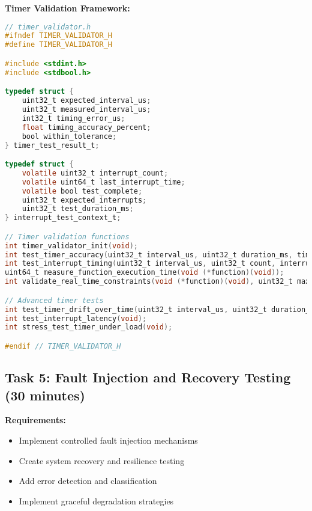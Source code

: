 \documentclass[11pt,a4paper]{article}
\begin{document}
\textbf{Timer Validation Framework:}
\begin{lstlisting}[language=C]
// timer_validator.h
#ifndef TIMER_VALIDATOR_H
#define TIMER_VALIDATOR_H

#include <stdint.h>
#include <stdbool.h>

typedef struct {
    uint32_t expected_interval_us;
    uint32_t measured_interval_us;
    int32_t timing_error_us;
    float timing_accuracy_percent;
    bool within_tolerance;
} timer_test_result_t;

typedef struct {
    volatile uint32_t interrupt_count;
    volatile uint64_t last_interrupt_time;
    volatile bool test_complete;
    uint32_t expected_interrupts;
    uint32_t test_duration_ms;
} interrupt_test_context_t;

// Timer validation functions
int timer_validator_init(void);
int test_timer_accuracy(uint32_t interval_us, uint32_t duration_ms, timer_test_result_t* result);
int test_interrupt_timing(uint32_t interval_us, uint32_t count, interrupt_test_context_t* context);
uint64_t measure_function_execution_time(void (*function)(void));
int validate_real_time_constraints(void (*function)(void), uint32_t max_time_us);

// Advanced timer tests
int test_timer_drift_over_time(uint32_t interval_us, uint32_t duration_minutes);
int test_interrupt_latency(void);
int stress_test_timer_under_load(void);

#endif // TIMER_VALIDATOR_H
\end{lstlisting}

\subsection{Task 5: Fault Injection and Recovery Testing (30 minutes)}

\textbf{Requirements:}
\begin{itemize}
    \item Implement controlled fault injection mechanisms
    \item Create system recovery and resilience testing
    \item Add error detection and classification
    \item Implement graceful degradation strategies
\end{itemize}
\end{document}
